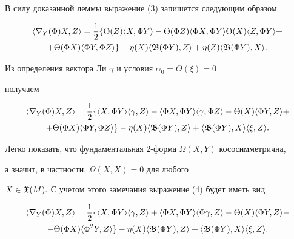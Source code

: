 В силу доказанной леммы выражение (3) запишется следующим образом:


\begin{multline*}


\langle \nabla_Y(\Phi)X,Z \rangle=


\frac 12 \{\Theta (Z) \langle X,\Phi Y \rangle- 


\Theta (\Phi Z) \langle \Phi X,\Phi Y \rangle 


\Theta (X) \langle Z,\Phi Y \rangle+ \\


+\Theta (\Phi X) \langle \Phi Y,\Phi Z \rangle \}-


\eta (X) \langle \frak B(\Phi Y),Z \rangle +


\eta (Z) \langle \frak B(\Phi Y),X \rangle.


\end{multline*} 


Из определения вектора Ли $\gamma$ и условия $\alpha_0=\Theta(\xi)=0$ 


получаем


\begin{multline}


\langle \nabla_Y(\Phi)X,Z \rangle=


\frac 12 \{ \langle X,\Phi Y \rangle \langle \gamma,Z \rangle-


\langle \Phi X,\Phi Y \rangle \langle \gamma,\Phi Z \rangle- 


\Theta (X) \langle \Phi Y,Z \rangle+\\


+\Theta (\Phi X) \langle \Phi Y,\Phi Z \rangle \}-


\eta (X) \langle \frak B(\Phi Y),Z \rangle +


\langle \frak B(\Phi Y),X \rangle \langle \xi,Z \rangle.


\end{multline}





Легко показать, что фундаментальная 2-форма $\Omega (X,Y)$ кососимметрична, 


а значит, в частности, $\Omega (X,X)=0$ для любого


$X\in\frak X(M).$ С учетом этого замечания выражение (4) будет иметь вид


\begin{multline*}


\langle \nabla_Y(\Phi)X,Z \rangle=


\frac 12 \{ \langle X,\Phi Y \rangle \langle \gamma,Z \rangle+


\langle \Phi X,\Phi Y \rangle \langle\Phi\gamma, Z\rangle- 


\Theta (X) \langle \Phi Y,Z \rangle-\\


-\Theta (\Phi X) \langle \Phi^2 Y, Z \rangle \}-


\eta (X) \langle \frak B(\Phi Y),Z \rangle +


\langle \frak B(\Phi Y),X \rangle \langle \xi, Z \rangle.


\end{multline*}


